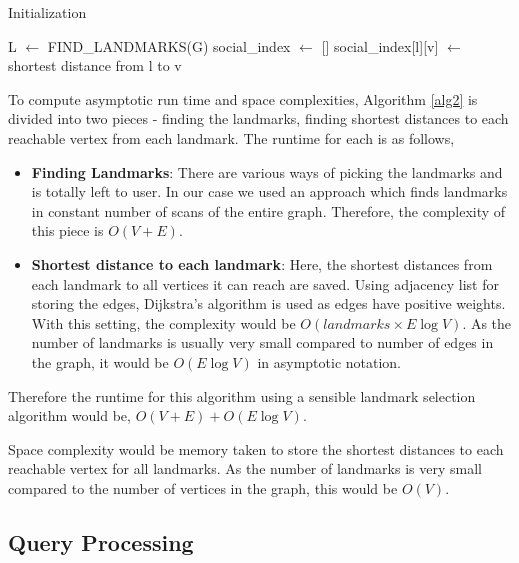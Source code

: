 \begin{algorithm}[t]
\caption{{\rrpsocial}  Initialization}
\begin{scriptsize}
\label{alg2}
\begin{algorithmic}[1]

  \State L $\gets$ FIND\_LANDMARKS(G) 
  \State social\_index $\gets$ []
	  	\State social\_index[l][v] $\gets $ shortest distance from l to v
	\EndFor
  \EndFor
\EndFunction
\end{algorithmic}

\end{scriptsize}
\end{algorithm}

To compute asymptotic run time and space complexities, Algorithm \ref{alg2} is divided into two pieces - finding the landmarks, finding shortest distances to each reachable vertex from each landmark. The runtime for each is as follows,
\begin{itemize}
	\item \textbf{Finding Landmarks}: There are various ways of picking the landmarks and is totally left to user. In our case we used an approach which finds landmarks in constant number of scans of the entire graph. Therefore, the complexity of this piece is $O(V + E)$.

	\item \textbf{Shortest distance to each landmark}: Here, the shortest distances from each landmark to all vertices it can reach are saved. Using adjacency list for storing the edges, Dijkstra's algorithm is used as edges have positive weights. With this setting, the complexity would be $O(landmarks \times E\log V)$. As the number of landmarks is usually very small compared to number of edges in the graph, it would be $O(E\log V)$ in asymptotic notation.
\end{itemize}

Therefore the runtime for this algorithm using a sensible landmark selection algorithm would be, $O(V + E) + O(E\log V)$.

Space complexity would be memory taken to store the shortest distances to each reachable vertex for all landmarks. As the number of landmarks is very small compared to the number of vertices in the graph, this would be $O(V)$.

\subsection{Query Processing} \label{querying}

